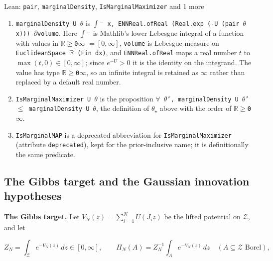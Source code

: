\documentclass[11pt,a4paper]{report}
\begin{document}
\begin{leanbox}{Lean: \texttt{pair}, \texttt{marginalDensity}, \texttt{IsMarginalMaximizer} and 1 more}
\begin{enumerate}
\item \texttt{marginal\allowbreak{}Density U \ensuremath{\theta}} is \texttt{\ensuremath{\int}\ensuremath{{}^{-}} x, ENNReal.\allowbreak{}of\allowbreak{}Real (Real.\allowbreak{}exp (-\allowbreak{}U (pair \ensuremath{\theta} x))) \ensuremath{\partial}volume}. Here \texttt{\ensuremath{\int}\ensuremath{{}^{-}}} is Mathlib's lower Lebesgue integral of a function with values in \texttt{\ensuremath{\mathbb R}\ensuremath{\ge}0\ensuremath{\infty}} \(=[0,\infty]\), \texttt{volume} is Lebesgue measure on \texttt{Euclidean\allowbreak{}Space \ensuremath{\mathbb R} (Fin dx)}, and \texttt{ENNReal.\allowbreak{}of\allowbreak{}Real} maps a real number \(t\) to \(\max(t,0)\in[0,\infty]\); since \(e^{-U}>0\) it is the identity on the integrand. The value has type \texttt{\ensuremath{\mathbb R}\ensuremath{\ge}0\ensuremath{\infty}}, so an infinite integral is retained as \(\infty\) rather than replaced by a default real number.

\item \texttt{Is\allowbreak{}Marginal\allowbreak{}Maximizer U \ensuremath{\theta}} is the proposition \texttt{\ensuremath{\forall} \ensuremath{\theta}', marginal\allowbreak{}Density U \ensuremath{\theta}' \ensuremath{\le} marginal\allowbreak{}Density U \ensuremath{\theta}}, the definition of \(\theta_\star\) above with the order of \texttt{\ensuremath{\mathbb R}\ensuremath{\ge}0\ensuremath{\infty}}.

\item \texttt{Is\allowbreak{}Marginal\allowbreak{}MAP} is a deprecated abbreviation for \texttt{Is\allowbreak{}Marginal\allowbreak{}Maximizer} (attribute \texttt{deprecated}), kept for the prior-inclusive name; it is definitionally the same predicate.

\end{enumerate}
\end{leanbox}
\subsection{\texorpdfstring{The Gibbs target and the Gaussian innovation hypotheses}{The Gibbs target and the Gaussian innovation hypotheses}}
\label{report-step-IPLA-Model-lean-2}


\textbf{The Gibbs target.} Let \(V_N(z)=\sum_{i=1}^NU(J_iz)\) be the lifted potential on \(\mathcal Z\), and let


\[Z_N=\int_{\mathcal Z}e^{-V_N(z)}\,dz\in[0,\infty],\qquad\Pi_N(A)=Z_N^{-1}\int_Ae^{-V_N(z)}\,dz\quad(A\subseteq\mathcal Z\text{ Borel}),\]
\end{document}

